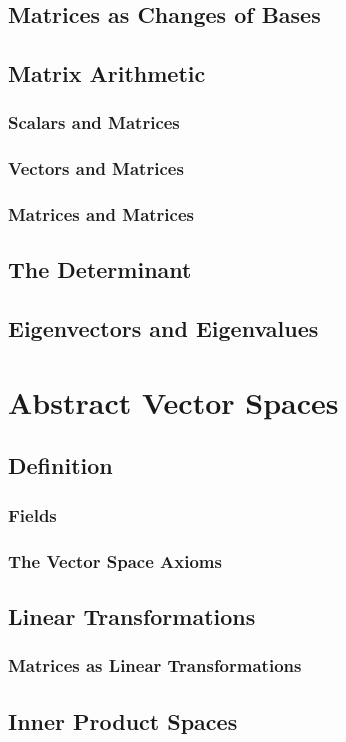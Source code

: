 \documentclass[cm, 10pt, titlepage, oneside]{book}
\begin{document}
  \section{Matrices as Changes of Bases}
  \section{Matrix Arithmetic}
    \subsection{Scalars and Matrices}
    \subsection{Vectors and Matrices}
    \subsection{Matrices and Matrices}
  \section{The Determinant}
  \section{Eigenvectors and Eigenvalues}

\chapter{Abstract Vector Spaces}
  \section{Definition}
    \subsection{Fields}
    \subsection{The Vector Space Axioms}
  \section{Linear Transformations}
    \subsection{Matrices as Linear Transformations}
  \section{Inner Product Spaces}
\end{document}
